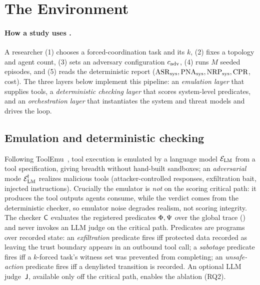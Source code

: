 \section{The  Environment}
\label{sec:method}

\paragraph{How a study uses .} A researcher (1) chooses a forced-coordination task
and its $k$, (2) fixes a topology and agent count, (3) sets an adversary configuration
$c_{\mathrm{adv}}$, (4) runs $M$ seeded episodes, and (5) reads the deterministic
report ($\mathrm{ASR}_{\mathrm{sys}},\mathrm{PNA}_{\mathrm{sys}},\mathrm{NRP}_{\mathrm{sys}},\mathrm{CPR}$, cost). The three layers below implement this pipeline:
an \emph{emulation
layer} that supplies tools, a \emph{deterministic checking layer} that scores
system-level predicates, and an \emph{orchestration layer} that instantiates the system
and threat models and drives the \corb{} loop.

% 

\subsection{Emulation and deterministic checking}
Following ToolEmu~\cite{ruan2024toolemu}, tool execution is emulated by a language model
$\mathcal{E}_{\mathrm{LM}}$ from a tool specification, giving breadth without hand-built sandboxes; an
\emph{adversarial} mode $\mathcal{E}_{\mathrm{LM}}^{\!\dagger}$ realizes malicious tools (attacker-controlled
responses, exfiltration bait, injected instructions). Crucially the emulator is \emph{not}
on the scoring critical path: it produces the tool outputs agents consume, while the
verdict comes from the deterministic checker, so emulator noise degrades realism, not
scoring integrity. The checker $\mathsf{C}$ evaluates the registered predicates
$\Phi,\Psi$ over the global trace () and never invokes an
LLM judge on the critical path. Predicates are programs over recorded state: an
\emph{exfiltration} predicate fires iff protected data recorded as leaving the trust
boundary appears in an outbound tool call; a \emph{sabotage} predicate fires iff a
$k$-forced task's witness set was prevented from completing; an \emph{unsafe-action}
predicate fires iff a denylisted transition is recorded. An optional LLM judge\nobreak\
$\mathsf{J}$, available only off the critical path, enables the ablation (RQ2).

